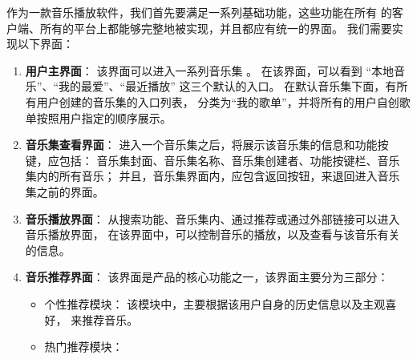  作为一款音乐播放软件，我们首先要满足一系列基础功能，这些功能在所有
的客户端、所有的平台上都能够完整地被实现，并且都应有统一的界面。
我们需要实现以下界面：
\begin{enumerate}
    \item \textbf{用户主界面}：
    该界面可以进入一系列音乐集 。
        在该界面，可以看到
        ``本地音乐''、``我的最爱''、``最近播放''
        这三个默认的入口。
        在默认音乐集下面，有所有用户创建的音乐集的入口列表，
        分类为``我的歌单''，并将所有的用户自创歌单按照用户指定的顺序展示。
    \item \textbf{音乐集查看界面}：
    进入一个音乐集之后，将展示该音乐集的信息和功能按键，应包括：
    音乐集封面、音乐集名称、音乐集创建者、功能按键栏、音乐集内的所有音乐；
    并且，音乐集界面内，应包含返回按钮，来退回进入音乐集之前的界面。
    \item \textbf{音乐播放界面}：
    从搜索功能、音乐集内、通过推荐或通过外部链接可以进入音乐播放界面，
        在该界面中，可以控制音乐的播放，以及查看与该音乐有关的信息。
    \item \textbf{音乐推荐界面}：
        该界面是产品的核心功能之一，该界面主要分为三部分：
        \begin{itemize}
            \item 个性推荐模块：
                该模块中，主要根据该用户自身的历史信息以及主观喜好，
                来推荐音乐。
            \item 热门推荐模块：

\end{itemize}
\end{enumerate}
